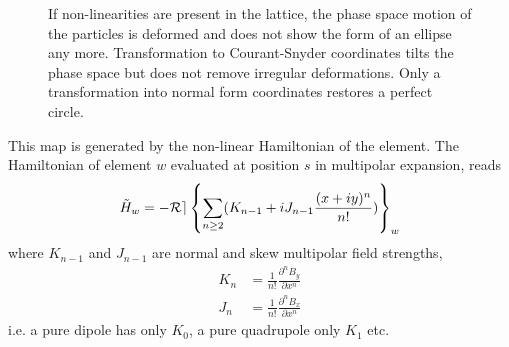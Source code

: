 \begin{figure}[ht]
    \centering
    
    
    
    \caption{
      If non-linearities are present in the lattice, the phase space motion of the particles is
      deformed and does not show the form of an ellipse any more. 
      Transformation to Courant-Snyder
      coordinates tilts the phase space but does not remove irregular deformations.
      Only a transformation into normal form coordinates restores a perfect circle.
    }
    \label{fig_phase_space_ellipse_nl}
\end{figure}

This map is generated by the non-linear Hamiltonian of the element.
The Hamiltonian of element $w$ evaluated at position $s$ in multipolar expansion,
reads
\begin{equation}
  \tilde{H}_w =
  -\mathcal{Re} \left\{ \sum\limits_{n\ge 2} (K_{n-1} + i J_{n-1}\frac{(x+iy)^n}{n!}) \right\}_w
  \label{eq_gen_hamil}
\end{equation}
%
where $K_{n-1}$ and $J_{n-1}$ are normal and skew multipolar field strengths,
%
\begin{align}
  K_n &= \frac{1}{n!}\frac{\partial^n B_y}{\partial x^{n}}\\
  J_n &= \frac{1}{n!}\frac{\partial^n B_x}{\partial x^{n}}
\end{align}
%
i.e. a pure dipole
has only $K_0$, a pure quadrupole only $K_1$ etc.

